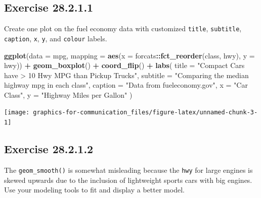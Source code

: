 \documentclass[]{book}
\newenvironment{Shaded}{\begin{snugshade}}{\end{snugshade}}
\newcommand{\DataTypeTok}[1]{\textcolor[rgb]{0.13,0.29,0.53}{#1}}
\newcommand{\KeywordTok}[1]{\textcolor[rgb]{0.13,0.29,0.53}{\textbf{#1}}}
\newcommand{\NormalTok}[1]{#1}
\newcommand{\OperatorTok}[1]{\textcolor[rgb]{0.81,0.36,0.00}{\textbf{#1}}}
\newcommand{\StringTok}[1]{\textcolor[rgb]{0.31,0.60,0.02}{#1}}
\theoremstyle{plain}
\theoremstyle{remark}
\begin{document}
\hypertarget{exercise-28.2.1.1}{%
\subsection*{\texorpdfstring{Exercise {28.2.1.1}}{Exercise 28.2.1.1}}\label{exercise-28.2.1.1}}

Create one plot on the fuel economy data with customized \texttt{title},
\texttt{subtitle}, \texttt{caption}, \texttt{x}, \texttt{y}, and \texttt{colour} labels.

\begin{Shaded}
\begin{Highlighting}[]
\KeywordTok{ggplot}\NormalTok{(}\DataTypeTok{data =}\NormalTok{ mpg,}
       \DataTypeTok{mapping =} \KeywordTok{aes}\NormalTok{(}\DataTypeTok{x =}\NormalTok{ forcats}\OperatorTok{::}\KeywordTok{fct_reorder}\NormalTok{(class, hwy), }\DataTypeTok{y =}\NormalTok{ hwy)) }\OperatorTok{+}
\StringTok{  }\KeywordTok{geom_boxplot}\NormalTok{() }\OperatorTok{+}
\StringTok{  }\KeywordTok{coord_flip}\NormalTok{() }\OperatorTok{+}
\StringTok{  }\KeywordTok{labs}\NormalTok{(}
    \DataTypeTok{title =} \StringTok{"Compact Cars have > 10 Hwy MPG than Pickup Trucks"}\NormalTok{,}
    \DataTypeTok{subtitle =} \StringTok{"Comparing the median highway mpg in each class"}\NormalTok{,}
    \DataTypeTok{caption =} \StringTok{"Data from fueleconomy.gov"}\NormalTok{,}
    \DataTypeTok{x =} \StringTok{"Car Class"}\NormalTok{,}
    \DataTypeTok{y =} \StringTok{"Highway Miles per Gallon"}
\NormalTok{  )}
\end{Highlighting}
\end{Shaded}

\begin{center}\texttt{[image: graphics-for-communication\_files/figure-latex/unnamed-chunk-3-1]} \end{center}

\hypertarget{exercise-28.2.1.2}{%
\subsection*{\texorpdfstring{Exercise {28.2.1.2}}{Exercise 28.2.1.2}}\label{exercise-28.2.1.2}}

The \texttt{geom\_smooth()} is somewhat misleading because the \texttt{hwy} for large engines is skewed upwards due to the inclusion of lightweight sports cars with big engines.
Use your modeling tools to fit and display a better model.
\end{document}
